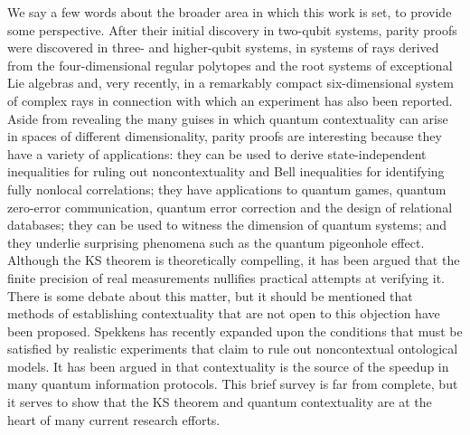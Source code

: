 We say a few words about the broader area in which this work is set, to provide some perspective. After their initial discovery in two-qubit systems\cite{Peres1991,Kernaghan1994,Cabello1996,Pavicic2010,Waegell2011c}, parity proofs were discovered in three-\cite{KP1995,Waegell2012a} and higher-qubit\cite{DiVin,Waegell2013} systems, in systems of rays derived from the four-dimensional regular polytopes \cite{Waegell2011a,Waegell2011b,Waegell2014} and the root systems of exceptional Lie algebras\cite{ruugeE6} and, very recently, in a remarkably compact six-dimensional system of complex rays\cite{Lisonek2013} in connection with which an experiment has also been reported\cite{canas2014a}. Aside from revealing the many guises in which quantum contextuality can arise in spaces of different dimensionality, parity proofs are interesting because they have a variety of applications: they can be used to derive state-independent inequalities for ruling out noncontextuality\cite{Cabello2008, badziag,kirchmair,bartosik,amselem ,moussa} and Bell inequalities for identifying fully nonlocal correlations\cite{Aolita}; they have applications to quantum games\cite{Ambrosio}, quantum zero-error communication\cite{Cubitt}, quantum error correction\cite{Error,raussendorf} and the design of relational databases\cite{Abramsky2012}; they can be used to witness the dimension of quantum systems\cite{guhne2014}; and they underlie surprising phenomena such as the quantum pigeonhole effect\cite{aharonov2014,yu2014,rae2014}. Although the KS theorem is theoretically compelling, it has been argued\cite{mayer,kent,barrett} that the finite precision of real measurements nullifies practical attempts at verifying it. There is some debate about this matter\cite{mermin}, but it should be mentioned that methods of establishing contextuality that are not open to this objection have been proposed\cite{Klyachko,Liang,Bengtsson,YuOh}. Spekkens\cite{spekkens} has recently expanded upon the conditions that must be satisfied by realistic experiments that claim to rule out noncontextual ontological models. It has been argued in \cite{emerson} that contextuality is the source of the speedup in many quantum information protocols. This brief survey is far from complete, but it serves to show that the KS theorem and quantum contextuality are at the heart of many current research efforts.\\

